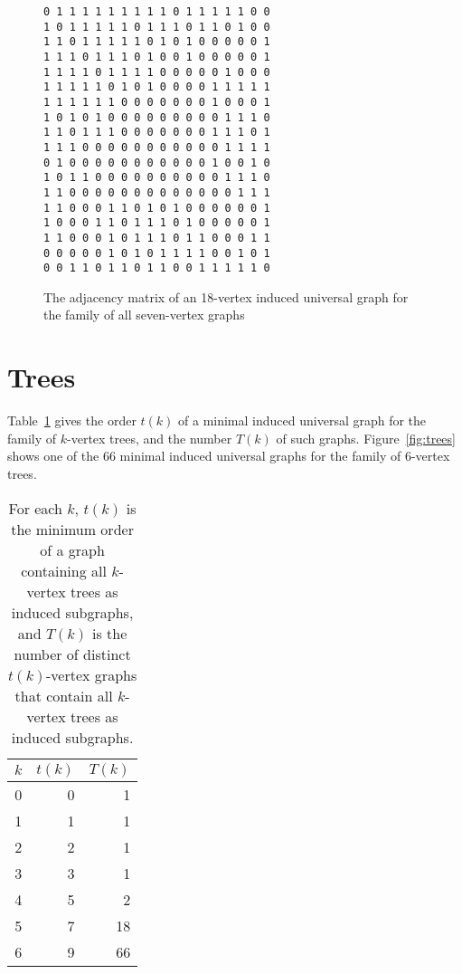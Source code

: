 \documentclass[12pt]{article}
\begin{document}
\begin{figure}[htb]
\centering
\small
\verb|0 1 1 1 1 1 1 1 1 1 0 1 1 1 1 1 0 0| \\
\verb|1 0 1 1 1 1 1 0 1 1 1 0 1 1 0 1 0 0| \\
\verb|1 1 0 1 1 1 1 1 0 1 0 1 0 0 0 0 0 1| \\
\verb|1 1 1 0 1 1 1 0 1 0 0 1 0 0 0 0 0 1| \\
\verb|1 1 1 1 0 1 1 1 1 0 0 0 0 0 1 0 0 0| \\
\verb|1 1 1 1 1 0 1 0 1 0 0 0 0 1 1 1 1 1| \\
\verb|1 1 1 1 1 1 0 0 0 0 0 0 0 1 0 0 0 1| \\
\verb|1 0 1 0 1 0 0 0 0 0 0 0 0 0 1 1 1 0| \\
\verb|1 1 0 1 1 1 0 0 0 0 0 0 0 1 1 1 0 1| \\
\verb|1 1 1 0 0 0 0 0 0 0 0 0 0 0 1 1 1 1| \\
\verb|0 1 0 0 0 0 0 0 0 0 0 0 0 1 0 0 1 0| \\
\verb|1 0 1 1 0 0 0 0 0 0 0 0 0 0 1 1 1 0| \\
\verb|1 1 0 0 0 0 0 0 0 0 0 0 0 0 0 1 1 1| \\
\verb|1 1 0 0 0 1 1 0 1 0 1 0 0 0 0 0 0 1| \\
\verb|1 0 0 0 1 1 0 1 1 1 0 1 0 0 0 0 0 1| \\
\verb|1 1 0 0 0 1 0 1 1 1 0 1 1 0 0 0 1 1| \\
\verb|0 0 0 0 0 1 0 1 0 1 1 1 1 0 0 1 0 1| \\
\verb|0 0 1 1 0 1 1 0 1 1 0 0 1 1 1 1 1 0|
\caption{The adjacency matrix of an 18-vertex induced universal graph for the family of all
seven-vertex graphs}
\label{fig:adjmat18}
\end{figure}

\section{Trees}\label{sec:trees}

Table~\ref{tab:treeresults} gives the order $t(k)$ of a minimal induced universal graph for
the family of $k$-vertex trees, and the number $T(k)$ of such graphs.  Figure~\ref{fig:trees}
shows one of the 66 minimal induced universal graphs for the family of 6-vertex trees.

\begin{table}[h!]
\centering
\begin{tabular}{r r r}
 \toprule
 $k$ & $t(k)$ & $T(k)$ \\ [0.5ex]
 \midrule
 0 & 0 & 1 \\
 1 & 1 & 1 \\
 2 & 2 & 1 \\
 3 & 3 & 1 \\
 4 & 5 & 2 \\
 5 & 7 & 18 \\
 6 & 9 & 66 \\
 \bottomrule
\end{tabular}
\caption{For each $k$, $t(k)$ is the minimum order of a graph containing all $k$-vertex trees as
induced subgraphs, and $T(k)$ is the number of distinct $t(k)$-vertex graphs that contain
all $k$-vertex trees as induced subgraphs.}
\label{tab:treeresults}
\end{table}
\end{document}
